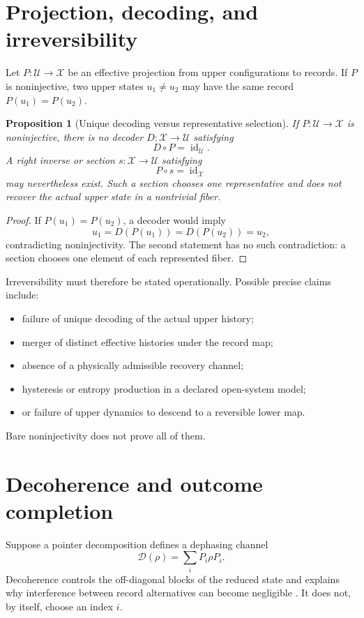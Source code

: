 \documentclass[11pt,a4paper]{article}
\newtheorem{proposition}[theorem]{Proposition}
\theoremstyle{definition}
\theoremstyle{remark}
\newcommand{\cD}{\mathcal{D}}
\newcommand{\cU}{\mathcal{U}}
\newcommand{\cX}{\mathcal{X}}
\begin{document}
\section{Projection, decoding, and irreversibility}

Let \(P:\cU\to\cX\) be an effective projection from upper configurations to
records. If \(P\) is noninjective, two upper states \(u_1\neq u_2\) may have
the same record \(P(u_1)=P(u_2)\).

\begin{proposition}[Unique decoding versus representative selection]
\label{prop:decoder}
If \(P:\cU\to\cX\) is noninjective, there is no decoder
\(D:\cX\to\cU\) satisfying
\[
D\circ P=\operatorname{id}_{\cU}.
\]
A right inverse or section \(s:\cX\to\cU\) satisfying
\[
P\circ s=\operatorname{id}_{\cX}
\]
may nevertheless exist. Such a section chooses one representative and does
not recover the actual upper state in a nontrivial fiber.
\end{proposition}

\begin{proof}
If \(P(u_1)=P(u_2)\), a decoder would imply
\[
u_1=D(P(u_1))=D(P(u_2))=u_2,
\]
contradicting noninjectivity. The second statement has no such contradiction:
a section chooses one element of each represented fiber.
\end{proof}

Irreversibility must therefore be stated operationally. Possible precise
claims include:
\begin{itemize}
\item failure of unique decoding of the actual upper history;
\item merger of distinct effective histories under the record map;
\item absence of a physically admissible recovery channel;
\item hysteresis or entropy production in a declared open-system model;
\item or failure of upper dynamics to descend to a reversible lower map.
\end{itemize}
Bare noninjectivity does not prove all of them.

\section{Decoherence and outcome completion}

Suppose a pointer decomposition defines a dephasing channel
\[
\cD(\rho)=\sum_iP_i\rho P_i.
\]
Decoherence controls the off-diagonal blocks of the reduced state and explains
why interference between record alternatives can become negligible
\cite{Zurek2003}. It does not, by itself, choose an index \(i\).
\end{document}
